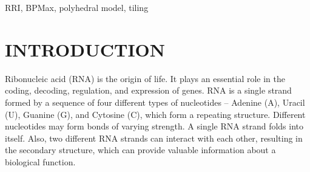 \documentclass[conference]{IEEEtran}
\newcommand{\Todo}[1]{\todo[inline, color=red!40]{#1}}
\begin{document}
\begin{IEEEkeywords}
RRI, BPMax, polyhedral model, tiling
\end{IEEEkeywords}
\section{\uppercase{Introduction}}
Ribonucleic acid (RNA) is the origin of life. It plays an essential role in the coding, decoding, regulation, and expression of genes. RNA is a single strand formed by a sequence of four different types of nucleotides – Adenine (A), Uracil (U), Guanine (G), and Cytosine (C), which form a repeating structure.  Different nucleotides may form bonds of varying strength. A single RNA strand folds into itself. Also, two different RNA strands can interact with each other, resulting in the secondary structure, which can provide valuable  information about a biological function.



\end{document}
